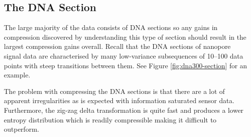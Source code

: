 \subsection{The DNA Section}



The large majority of the data consists of DNA sections so any gains in
compression discovered by understanding this type of section should
result in the largest compression gains overall. Recall that the DNA sections of
nanopore signal data are characterised by many low-variance subsequences of 10--100
data points with steep transitions between them. See Figure
\ref{fig:dna300-section} for an example.

The problem with compressing the DNA sections is that there are a lot of
apparent irregularities as is expected with information saturated sensor data.
Furthermore, the zig-zag delta transformation is quite fast and produces a lower
entropy distribution which is readily compressible making it difficult to outperform.


